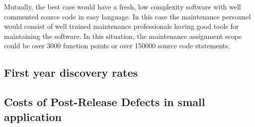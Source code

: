 Mutually, the best case would have a fresh, low complexity software with well commented source code in easy language. In this case the maintenance personnel would consist of well trained maintenance professionals having good tools for maintaining the software. In this situation, the maintenance assignment scope could be over 3000 function points or over 150000 source code statements.

\subsection{First year discovery rates}


\subsection{Costs of Post-Release Defects in small application}

